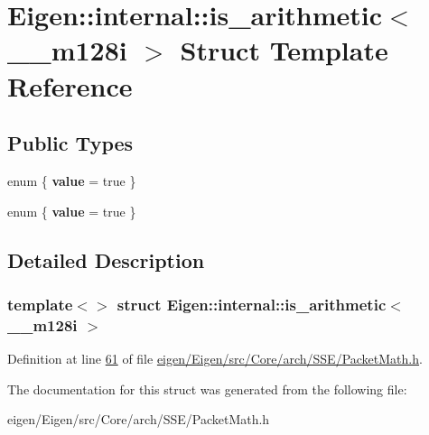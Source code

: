 \hypertarget{struct_eigen_1_1internal_1_1is__arithmetic_3_01____m128i_01_4}{}\section{Eigen\+:\+:internal\+:\+:is\+\_\+arithmetic$<$ \+\_\+\+\_\+m128i $>$ Struct Template Reference}
\label{struct_eigen_1_1internal_1_1is__arithmetic_3_01____m128i_01_4}
\subsection*{Public Types}
\begin{DoxyCompactItemize}
\item 
\mbox{\label{struct_eigen_1_1internal_1_1is__arithmetic_3_01____m128i_01_4_a5fff0896e84c34caab9c2c0fc483d490}} 
enum \{ {\bfseries value} = true
 \}
\item 
\mbox{\label{struct_eigen_1_1internal_1_1is__arithmetic_3_01____m128i_01_4_ab97ad316a44a1d86524a9b499cbf7aa9}} 
enum \{ {\bfseries value} = true
 \}
\end{DoxyCompactItemize}


\subsection{Detailed Description}
\subsubsection*{template$<$$>$\newline
struct Eigen\+::internal\+::is\+\_\+arithmetic$<$ \+\_\+\+\_\+m128i $>$}



Definition at line \hyperlink{eigen_2_eigen_2src_2_core_2arch_2_s_s_e_2_packet_math_8h_source_l00061}{61} of file \hyperlink{eigen_2_eigen_2src_2_core_2arch_2_s_s_e_2_packet_math_8h_source}{eigen/\+Eigen/src/\+Core/arch/\+S\+S\+E/\+Packet\+Math.\+h}.



The documentation for this struct was generated from the following file\+:\begin{DoxyCompactItemize}
\item 
eigen/\+Eigen/src/\+Core/arch/\+S\+S\+E/\+Packet\+Math.\+h\end{DoxyCompactItemize}
